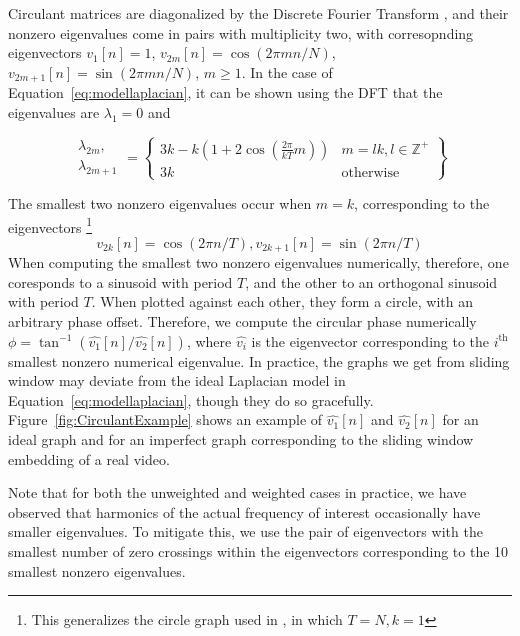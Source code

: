 \documentclass{article}
\begin{document}
Circulant matrices are diagonalized by the Discrete Fourier Transform \cite{godsil2013algebraic}, and their nonzero eigenvalues come in pairs with multiplicity two, with corresopnding eigenvectors $v_1[n] = 1$, $v_{2m}[n] = \cos(2 \pi mn / N)$, $v_{2m+1}[n] = \sin(2 \pi m n / N)$, $m \geq 1$.  In the case of Equation~\ref{eq:modellaplacian}, it can be shown using the DFT that the eigenvalues are $\lambda_1 = 0$ and 

\begin{equation}
\begin{array}{cc}\lambda_{2m},\\\lambda_{2m+1}\end{array} = \left\{ \begin{array}{cc} 3k - k\left( 1 + 2 \cos \left( \frac{2 \pi}{kT} m \right) \right) & m = lk, l \in \mathbb{Z}^+ \\ 3k & \text{otherwise}  \end{array} \right\} 
\end{equation}

The smallest two nonzero eigenvalues occur when $m = k$, corresponding to the eigenvectors \footnote{This generalizes the circle graph used in \cite{averbuch2015ringit}, in which $T = N, k = 1$} 
\begin{equation}
v_{2k}[n] = \cos(2 \pi n / T), v_{2k+1}[n] = \sin(2 \pi n / T)
\end{equation}
When computing the smallest two nonzero eigenvalues numerically, therefore, one coresponds to a sinusoid with period $T$, and the other to an orthogonal sinusoid with period $T$.  When plotted against each other, they form a circle, with an arbitrary phase offset.  Therefore, we compute the circular phase numerically $\phi = \tan^{-1}(\hat{v_1}[n] / \hat{v_2}[n])$, where $\hat{v_i}$ is the eigenvector corresponding to the $i^\text{th}$ smallest nonzero numerical eigenvalue.  In practice, the graphs we get from sliding window may deviate from the ideal Laplacian model in Equation~\ref{eq:modellaplacian}, though they do so gracefully.  Figure~\ref{fig:CirculantExample} shows an example of $\hat{v_1}[n]$ and $\hat{v_2}[n]$ for an ideal graph and for an imperfect graph corresponding to the sliding window embedding of a real video.  

Note that for both the unweighted and weighted cases in practice, we have observed that harmonics of the actual frequency of interest occasionally have smaller eigenvalues.  To mitigate this, we use the pair of eigenvectors with the smallest number of zero crossings within the eigenvectors corresponding to the 10 smallest nonzero eigenvalues.
\end{document}
